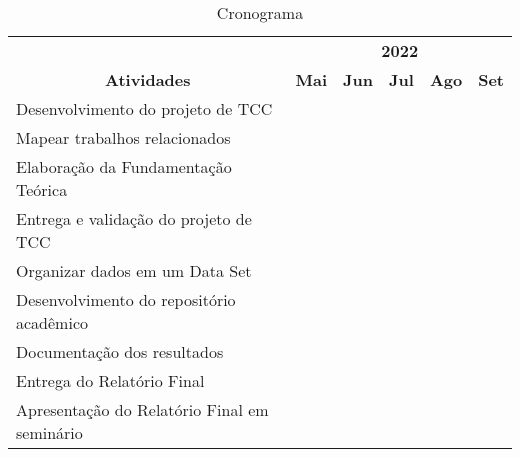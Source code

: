 \begin{table}[H]
      \caption{Cronograma}
      \begin{tabular}{|l|l|l|l|l|l|}
            \hline
            \multicolumn{1}{|c|}{}                                      & \multicolumn{5}{c|}{\textbf{2022}}                                                                                     \\ \cline{2-6}
            \multicolumn{1}{|c|}{\multirow{-2}{*}{\textbf{Atividades}}} & \textbf{Mai}                       & \textbf{Jun}             & \textbf{Jul}             & \textbf{Ago} & \textbf{Set} \\ \hline
            Desenvolvimento do projeto de TCC                           & \cellcolor[HTML]{000000}           & \cellcolor[HTML]{000000} & \cellcolor[HTML]{C0C0C0} &              &              \\ \hline
            Mapear trabalhos relacionados                               & \cellcolor[HTML]{000000}           & \cellcolor[HTML]{000000} & \cellcolor[HTML]{C0C0C0} &              &              \\ \hline
            Elaboração da Fundamentação Teórica                         &                                    & \cellcolor[HTML]{C0C0C0} & \cellcolor[HTML]{C0C0C0} &              &              \\ \hline
            Entrega e validação do projeto de TCC                       &                                    & \cellcolor[HTML]{C0C0C0} & \cellcolor[HTML]{C0C0C0} &              &              \\ \hline
            Organizar dados em um Data Set                              &                                    &                          &                          &              &              \\ \hline
            Desenvolvimento do repositório acadêmico                    &                                    &                          &                          &              &              \\ \hline
            Documentação dos resultados                                 &                                    &                          &                          &              &              \\ \hline
            Entrega do Relatório Final                                  &                                    &                          &                          &              &              \\ \hline
            Apresentação do Relatório Final em seminário                &                                    &                          &                          &              &              \\ \hline
      \end{tabular}
\end{table}

